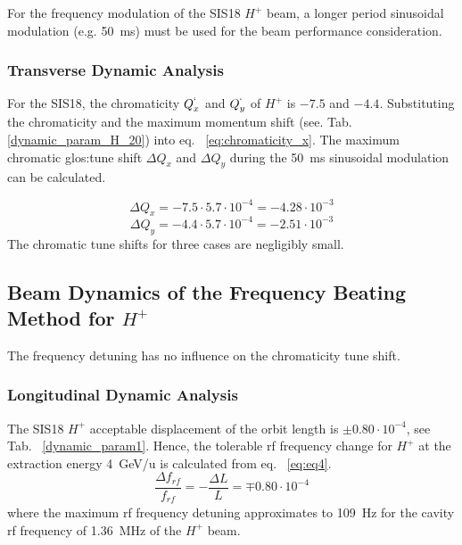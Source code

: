 For the frequency modulation of the SIS18 $H^+$ beam, a longer period sinusoidal modulation (e.g. \SI{50}{ms}) must be used for the beam performance consideration. 
 
	\subsubsection{Transverse Dynamic Analysis}

For the SIS18, the chromaticity $Q^`_x$ and $Q^`_y$ of $H^+$ is $-7.5$ and $-4.4$. Substituting the chromaticity and the maximum momentum shift (see. Tab. \ref{dynamic_param_H_20}) into eq. ~\ref{eq:chromaticity_x}. The maximum chromatic \gls{glos:tune} shift $\Delta Q_x$ and $\Delta Q_y$ during the \SI{50}{ms} sinusoidal modulation can be calculated. 

\begin{equation}
\Delta Q_x = -7.5\cdot 5.7\cdot 10^{-4}=-4.28 \cdot 10^{-3}
\end{equation}
\begin{equation}
\Delta Q_y = -4.4\cdot 5.7\cdot 10^{-4}=-2.51\cdot 10^{-3} 
\end{equation}
The chromatic tune shifts for three cases are negligibly small.

\subsection{Beam Dynamics of the Frequency Beating Method for $H^+$} 
The frequency detuning has no influence on the chromaticity tune shift.

\subsubsection{Longitudinal Dynamic Analysis}

The SIS18 $H^+$ acceptable displacement of the orbit length is $\pm0.80\cdot10^{-4}$, see Tab. ~\ref{dynamic_param1}. Hence, the tolerable rf frequency change for $H^{+}$ at the extraction energy \SI{4}{GeV/u} is calculated from eq. ~\ref{eq:eq4}.
\begin{equation}
\frac{\Delta{f}_\mathit{rf}}{f_\mathit{rf}} = -\frac{\Delta L}{L}= \mp 0.80 \cdot 10^{-4}
\end{equation}
where the maximum rf frequency detuning approximates to \SI{109}{Hz} for the cavity rf frequency of \SI{1.36}{MHz} of the $H^+$ beam.
